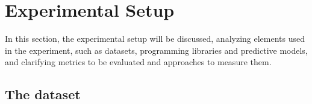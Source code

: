 
%


\section{Experimental Setup}

In this section, the experimental setup will be discussed, analyzing elements used in the experiment, such as datasets, programming libraries and predictive models, and clarifying metrics to be evaluated and approaches to measure them.  

\subsection{The dataset}

